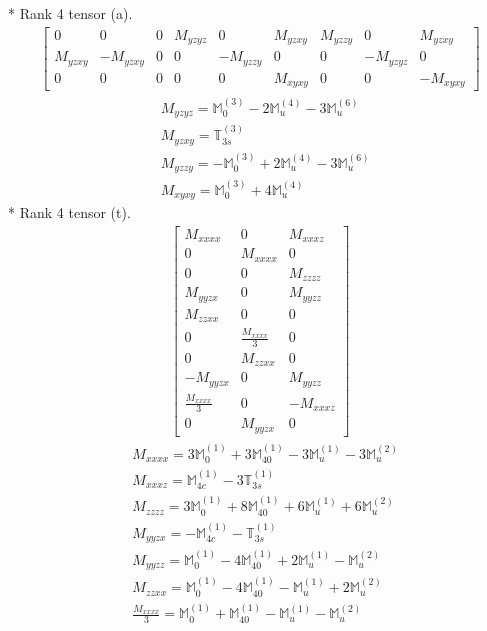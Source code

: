 \documentclass[fleqn,8pt,landscape]{jsarticle}
\begin{document}
* Rank 4 tensor (a).
\begin{align*}
\begin{bmatrix} 0 & 0 & 0 & M_{yzyz} & 0 & M_{yzxy} & M_{yzzy} & 0 & M_{yzxy} \\ M_{yzxy} & - M_{yzxy} & 0 & 0 & - M_{yzzy} & 0 & 0 & - M_{yzyz} & 0 \\ 0 & 0 & 0 & 0 & 0 & M_{xyxy} & 0 & 0 & - M_{xyxy} \end{bmatrix}
\end{align*}
\begin{align*}
& M_{yzyz} = \mathbb{M}_{0}^{(3)} - 2 \mathbb{M}_{u}^{(4)} - 3 \mathbb{M}_{u}^{(6)} \\
& M_{yzxy} = \mathbb{T}_{3s}^{(3)} \\
& M_{yzzy} = - \mathbb{M}_{0}^{(3)} + 2 \mathbb{M}_{u}^{(4)} - 3 \mathbb{M}_{u}^{(6)} \\
& M_{xyxy} = \mathbb{M}_{0}^{(3)} + 4 \mathbb{M}_{u}^{(4)}
\end{align*}
* Rank 4 tensor (t).
\begin{align*}
\begin{bmatrix} M_{xxxx} & 0 & M_{xxxz} \\ 0 & M_{xxxx} & 0 \\ 0 & 0 & M_{zzzz} \\ M_{yyzx} & 0 & M_{yyzz} \\ M_{zzxx} & 0 & 0 \\ 0 & \frac{M_{xxxx}}{3} & 0 \\ 0 & M_{zzxx} & 0 \\ - M_{yyzx} & 0 & M_{yyzz} \\ \frac{M_{xxxx}}{3} & 0 & - M_{xxxz} \\ 0 & M_{yyzx} & 0 \end{bmatrix}
\end{align*}
\begin{align*}
& M_{xxxx} = 3 \mathbb{M}_{0}^{(1)} + 3 \mathbb{M}_{40}^{(1)} - 3 \mathbb{M}_{u}^{(1)} - 3 \mathbb{M}_{u}^{(2)} \\
& M_{xxxz} = \mathbb{M}_{4c}^{(1)} - 3 \mathbb{T}_{3s}^{(1)} \\
& M_{zzzz} = 3 \mathbb{M}_{0}^{(1)} + 8 \mathbb{M}_{40}^{(1)} + 6 \mathbb{M}_{u}^{(1)} + 6 \mathbb{M}_{u}^{(2)} \\
& M_{yyzx} = - \mathbb{M}_{4c}^{(1)} - \mathbb{T}_{3s}^{(1)} \\
& M_{yyzz} = \mathbb{M}_{0}^{(1)} - 4 \mathbb{M}_{40}^{(1)} + 2 \mathbb{M}_{u}^{(1)} - \mathbb{M}_{u}^{(2)} \\
& M_{zzxx} = \mathbb{M}_{0}^{(1)} - 4 \mathbb{M}_{40}^{(1)} - \mathbb{M}_{u}^{(1)} + 2 \mathbb{M}_{u}^{(2)} \\
& \frac{M_{xxxx}}{3} = \mathbb{M}_{0}^{(1)} + \mathbb{M}_{40}^{(1)} - \mathbb{M}_{u}^{(1)} - \mathbb{M}_{u}^{(2)}
\end{align*}
\end{document}
